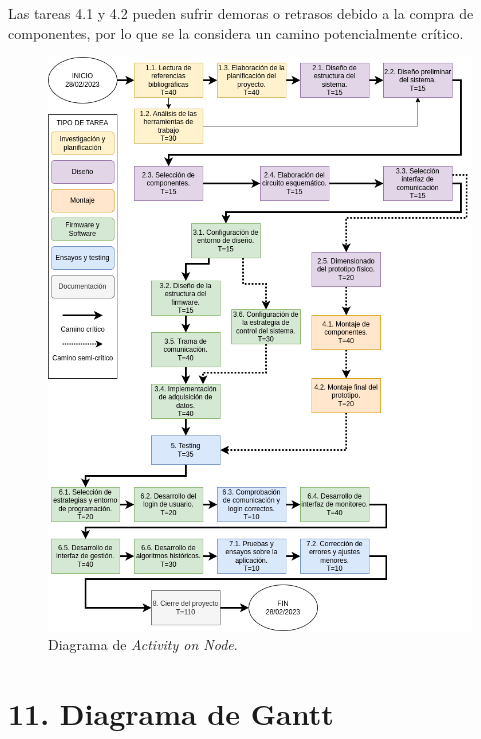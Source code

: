 \documentclass[
11pt, %
codirector, %
]{charter}
\begin{document}
Las tareas 4.1 y 4.2 pueden sufrir demoras o retrasos debido a la compra de componentes, por lo que se la considera un camino potencialmente crítico. 

\begin{figure}[htpb]
\centering 
\includegraphics[width=.8\textwidth]{./Figuras/AoN.png}
\caption{Diagrama de \textit{Activity on Node}.}
\label{fig:AoN}
\end{figure}


\section{11. Diagrama de Gantt}
\label{sec:gantt}
\end{document}
